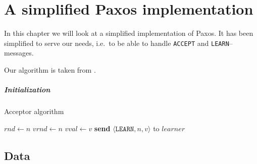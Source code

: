 \chapter{A simplified Paxos implementation}

In this chapter we will look at a simplified implementation of Paxos.
It has been simplified to serve our needs, i.e.~to be able to handle
\texttt{ACCEPT} and \texttt{LEARN}--messages.

Our algorithm is taken from \cite{Insane.Paxos}.

\paragraph{Initialization}


\begin{algorithm}
\caption{Acceptor algorithm}
\label{paxos.algorithm.acceptor}
\begin{algorithmic}[1]
   \State $rnd\gets n$
   \State $vrnd\gets n$
   \State $vval\gets v$
      \State \textbf{send} $\langle \texttt{LEARN}, n, v \rangle $ to $learner$
   \EndFor
\EndFunction
\end{algorithmic}
\end{algorithm}



\section{Data}

